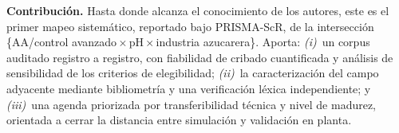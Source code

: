 \noindent\textbf{Contribución.} Hasta donde alcanza el conocimiento de los
autores, este es el primer mapeo sistemático, reportado bajo PRISMA-ScR,
de la intersección \{AA/control avanzado\,$\times$\,pH\,$\times$\,industria
azucarera\}. Aporta: \emph{(i)}~un corpus auditado registro a registro,
con fiabilidad de cribado cuantificada y análisis de sensibilidad de los
criterios de elegibilidad; \emph{(ii)}~la caracterización del campo
adyacente mediante bibliometría y una verificación léxica independiente;
y \emph{(iii)}~una agenda priorizada por transferibilidad técnica y nivel
de madurez, orientada a cerrar la distancia entre simulación y validación
en planta.
